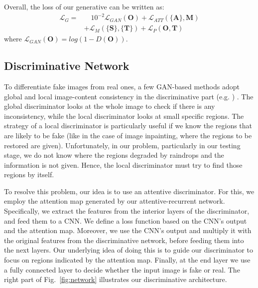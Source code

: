 \documentclass[10pt,twocolumn,letterpaper]{article}
\begin{document}
Overall, the loss of our generative can be written as:
\begin{equation}
\label{eq_g}
\begin{split}
\mathcal{L}_G =  & \quad {{10}^{-2}} \mathcal{L}_{GAN}(\mathbf{O}) + \mathcal{L}_{ATT}(\{\mathbf{A}\},\mathbf{M})\\
& + \mathcal{L}_M(\{\mathbf{S}\}, \{\mathbf{T}\}) + \mathcal{L}_P(\mathbf{O}, \mathbf{T})
\end{split}
\end{equation}
where $\mathcal{L}_{GAN}(\mathbf{O}) = log(1 - D(\mathbf{O}))$.



\subsection{Discriminative Network}
To differentiate fake images from real ones, a few GAN-based methods adopt global and local image-content consistency in the discriminative part (e.g. \cite{iizuka2017globally,li2017generative}) . The global discriminator looks at the whole image to check if there is any inconsistency, while the local discriminator looks at small specific regions. The strategy of a local discriminator is particularly useful if we know the regions that are likely to be fake (like in the case of image inpainting, where the regions to be restored  are given). Unfortunately, in our problem, particularly in our testing stage, we do not know where the regions degraded by raindrops and the information is not given. Hence, the local discriminator must try to find those regions by itself.


To resolve this problem, our idea is to use an attentive discriminator. For this, we employ the attention map generated by our attentive-recurrent network. Specifically, we extract the features from the interior layers of the discriminator, and feed them to a CNN. We define a loss function based on the CNN's output and the attention map. Moreover, we use the CNN's output and  multiply it with the original features from the discriminative network, before feeding them into the next layers.  Our underlying idea of doing this is to guide our discriminator to focus on regions indicated by the attention map. Finally, at the end layer we use a fully connected layer to decide whether the input image is fake or real. The right part of Fig.~\ref{fig:network} illustrates our discriminative architecture. 
\end{document}
